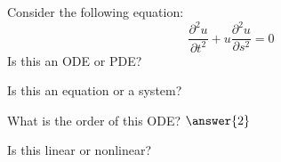 \documentclass{ximera}
\begin{document}
\begin{exercise}
    Consider the following equation:  
    \[
        \frac{\partial^2 u}{\partial t^2} + u\frac{\partial^2 u}{\partial s^2} = 0
    \]
    Is this an ODE or PDE?
    \begin{multipleChoice}
    \end{multipleChoice}
    \begin{problem}
        Is this an equation or a system?
        \begin{multipleChoice}
        \end{multipleChoice}
        
        \begin{problem}
            What is the order of this ODE? $\answer{2}$
            
            \begin{problem}
                Is this linear or nonlinear?
                \begin{multipleChoice}
                \end{multipleChoice}
                
%                    
            \end{problem}
        \end{problem}
    \end{problem}
\end{exercise}
\end{document}
